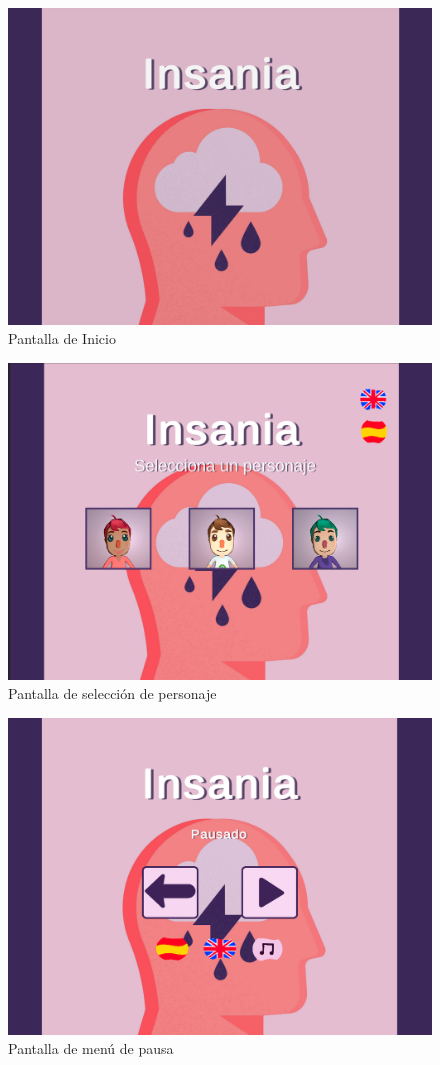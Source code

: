 \documentclass[12pt, a4paper,twoside,titlepage]{book}
\begin{document}
\begin{figure}
	\centering
	\includegraphics[width=.8\linewidth]{TGF/Artes/Portada.png}
	\caption{Pantalla de Inicio}
	\label{fig:UXInicio}
\end{figure}

\begin{figure}
	\centering
	\includegraphics[width=.8\linewidth]{TGF/Artes/Personajes.png}
	\caption{Pantalla de selección de personaje}
	\label{fig:UXSelec}
\end{figure}

\begin{figure}
	\centering
	\includegraphics[width=.8\linewidth]{TGF/Artes/Pausa.png}
	\caption{Pantalla de menú de pausa}
	\label{fig:UXPausa}
\end{figure}
\end{document}
